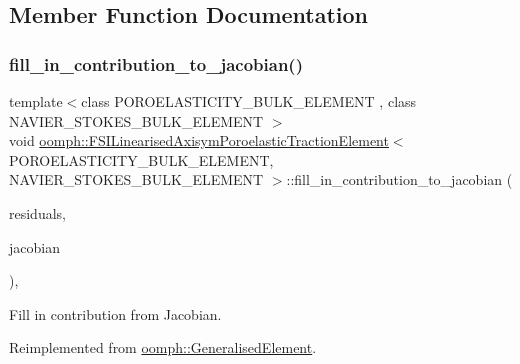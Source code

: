 \subsection{Member Function Documentation}
\mbox{\label{classoomph_1_1FSILinearisedAxisymPoroelasticTractionElement_a98dbef42bb96b9d1f53184161e860a98}} 
\subsubsection{\texorpdfstring{fill\+\_\+in\+\_\+contribution\+\_\+to\+\_\+jacobian()}{fill\_in\_contribution\_to\_jacobian()}}
{\footnotesize\ttfamily template$<$class P\+O\+R\+O\+E\+L\+A\+S\+T\+I\+C\+I\+T\+Y\+\_\+\+B\+U\+L\+K\+\_\+\+E\+L\+E\+M\+E\+NT , class N\+A\+V\+I\+E\+R\+\_\+\+S\+T\+O\+K\+E\+S\+\_\+\+B\+U\+L\+K\+\_\+\+E\+L\+E\+M\+E\+NT $>$ \\
void \hyperlink{classoomph_1_1FSILinearisedAxisymPoroelasticTractionElement}{oomph\+::\+F\+S\+I\+Linearised\+Axisym\+Poroelastic\+Traction\+Element}$<$ P\+O\+R\+O\+E\+L\+A\+S\+T\+I\+C\+I\+T\+Y\+\_\+\+B\+U\+L\+K\+\_\+\+E\+L\+E\+M\+E\+NT, N\+A\+V\+I\+E\+R\+\_\+\+S\+T\+O\+K\+E\+S\+\_\+\+B\+U\+L\+K\+\_\+\+E\+L\+E\+M\+E\+NT $>$\+::fill\+\_\+in\+\_\+contribution\+\_\+to\+\_\+jacobian (\begin{DoxyParamCaption}\item[{\hyperlink{classoomph_1_1Vector}{Vector}$<$ double $>$ \&}]{residuals,  }\item[{\hyperlink{classoomph_1_1DenseMatrix}{Dense\+Matrix}$<$ double $>$ \&}]{jacobian }\end{DoxyParamCaption})\hspace{0.3cm}{\ttfamily [inline]}, {\ttfamily [virtual]}}



Fill in contribution from Jacobian. 



Reimplemented from \hyperlink{classoomph_1_1GeneralisedElement_a6ae09fc0d68e4309ac1b03583d252845}{oomph\+::\+Generalised\+Element}.



